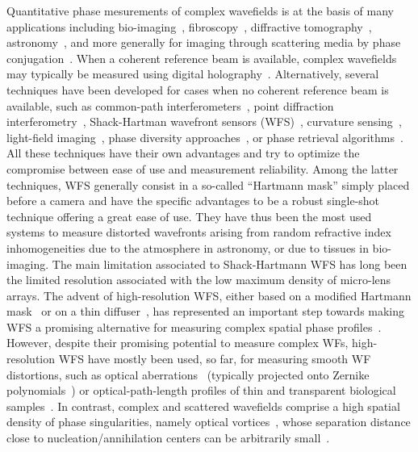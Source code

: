 \documentclass[10pt,twocolumn,twoside,letterpaper]{article}
\begin{document}
Quantitative phase mesurements of complex wavefields is at the basis of many applications including bio-imaging~\cite{naji,Betzig_NM_14,Jesacher_BioArxiv_21}, fibroscopy~\cite{Choi_PRL_12,Moser_OE_15}, diffractive tomography~\cite{Lauer_MST_08},  astronomy~\cite{Tyler_JOSA_2000}, 
and more generally for imaging through scattering media by phase conjugation~\cite{Gigan_NC_10,Yang_NP_15}.
When a coherent reference beam is available, complex wavefields may typically be measured using digital holography~\cite{Cuche1999,Matoba_DH_review_18}. 
Alternatively, several techniques have been developed for cases when no coherent reference beam is available, such as common-path interferometers~\cite{Marte_OE_06,Yang_APL_12,Marte_OE_14,So_Optica_17,Rosen_AOP_19}, point diffraction interferometry~\cite{Paterson_OC_08}, Shack-Hartman wavefront sensors (WFS)~\cite{Shack2001}, curvature sensing~\cite{Roddier_AO_88}, light-field imaging~\cite{Prevedel_NM_14}, phase diversity approaches~\cite{Khare_AO_15}, or phase retrieval algorithms~\cite{Fienup_AO_82,Paganin_PRE_01,Almoro2006}. All these techniques have their own advantages and try to optimize the compromise between ease of use and measurement reliability.
Among the latter techniques, WFS generally consist in a so-called ``Hartmann mask'' simply placed before a camera and have the specific advantages to be a robust single-shot technique offering a great ease of use. They have thus been the most used systems to measure distorted wavefronts arising from random refractive index inhomogeneities due to the atmosphere in astronomy, or due to tissues in bio-imaging. The main limitation associated to Shack-Hartmann WFS has long been the limited resolution associated with the low maximum density of micro-lens arrays. 
The advent of high-resolution WFS, either based on a modified Hartmann mask~\cite{Bon2009} or on a thin diffuser~\cite{Berujon_PRL_12, Berto_OL_17, Heidrich_OE_17, Heidrich_SR_19}, has represented an important step towards making WFS a promising alternative for measuring complex spatial phase profiles~\cite{Vellekoop_PRL_17}. 
However, despite their promising potential to measure complex WFs, high-resolution WFS have mostly been used, so far, for measuring smooth WF distortions, such as optical aberrations~\cite{naji,Betzig_NM_14} (typically projected onto Zernike polynomials~\cite{Love_AO_97}) or optical-path-length profiles of thin and transparent biological samples~\cite{Bon2009,Berto_OL_17}.
In contrast, complex and scattered wavefields comprise a high spatial density of phase singularities, namely optical vortices~\cite{Berry_PRSLA_74}, whose separation distance close to nucleation/annihilation centers can be arbitrarily small~\cite{Freund_PRL_94,Dennis_JPA_08, Pascucci_PRL_16}. 
\end{document}
